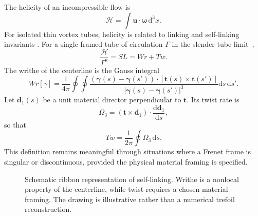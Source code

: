 \documentclass[aps,pre,preprint,notitlepage,nofootinbib,superscriptaddress]{revtex4-2}
\newcommand{\dd}{\mathrm d}
\newcommand{\calH}{\mathcal H}
\begin{document}
The helicity of an incompressible flow is
\begin{equation}
  \calH=\int \bm u\cdot\bm\omega\,\dd^3x.
\end{equation}
For isolated thin vortex tubes, helicity is related to linking and self-linking invariants \cite{Moffatt1969,MoffattRicca1992}.  For a single framed tube of circulation $\Gamma$ in the slender-tube limit~\cite{Calugareanu1961,White1969,MoffattRicca1992},
\begin{equation}
  \frac{\calH}{\Gamma^2}=SL=Wr+Tw.
  \label{eq:calugareanu}
\end{equation}
The writhe of the centerline is the Gauss integral
\begin{equation}
  Wr[\gamma]=\frac{1}{4\pi}
  \oint\!\oint
  \frac{(\bm\gamma(s)-\bm\gamma(s'))\cdot
        [\bm t(s)\times\bm t(s')]}
       {|\bm\gamma(s)-\bm\gamma(s')|^3}
  \dd s\,\dd s'.
  \label{eq:writhe}
\end{equation}
Let $\bm d_1(s)$ be a unit material director perpendicular to $\bm t$.  Its twist rate is
\begin{equation}
  \Omega_3=(\bm t\times\bm d_1)\cdot\frac{\dd\bm d_1}{\dd s},
\end{equation}
so that
\begin{equation}
  Tw=\frac{1}{2\pi}\oint\Omega_3\,\dd s.
  \label{eq:twist}
\end{equation}
This definition remains meaningful through situations where a Frenet frame is singular or discontinuous, provided the physical material framing is specified.

\begin{figure}[t]
\centering
{}
\caption{Schematic ribbon representation of self-linking.  Writhe is a nonlocal property of the centerline, while twist requires a chosen material framing.  The drawing is illustrative rather than a numerical trefoil reconstruction.}
\label{fig:ribbon}
\end{figure}
\end{document}
